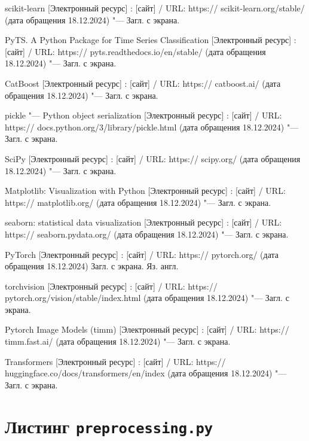 \documentclass[spec, och, diploma]{SCWorks}
\begin{document}
\begin{thebibliography}{99}
     scikit-learn [Электронный ресурс] : [сайт] / URL:
    https:// scikit-learn.org/stable/ (дата обращения 18.12.2024) "--- Загл. с
    экрана.

     PyTS. A Python Package for Time Series Classification
    [Электронный ресурс] : [сайт] / URL: https:// pyts.readthedocs.io/en/stable/
    (дата обращения 18.12.2024) "--- Загл. с экрана.

     CatBoost [Электронный ресурс] : [сайт] / URL:
    https:// catboost.ai/ (дата обращения 18.12.2024) "--- Загл. с экрана.

     pickle "--- Python object serialization [Электронный
    ресурс] : [сайт] / URL: https:// docs.python.org/3/library/pickle.html (дата
    обращения 18.12.2024) "--- Загл. с экрана.

     SciPy [Электронный ресурс] : [сайт] / URL:
    https:// scipy.org/ (дата обращения 18.12.2024) "--- Загл. с экрана.

     Matplotlib: Visualization with Python
    [Электронный
    ресурс] : [сайт] / URL: https:// matplotlib.org/ (дата обращения 18.12.2024)
    "--- Загл. с экрана.

     seaborn: statistical data visualization [Электронный
    ресурс] : [сайт] / URL: https:// seaborn.pydata.org/ (дата обращения
    18.12.2024) "--- Загл. с экрана.

     PyTorch [Электронный ресурс] : [сайт] / URL:
    https:// pytorch.org/ (дата обращения 18.12.2024) Загл. с экрана. Яз. англ.

     torchvision [Электронный ресурс] : [сайт] / URL:
    https:// pytorch.org/vision/stable/index.html (дата обращения 18.12.2024)
    "--- Загл. с экрана.

     Pytorch Image Models (timm) [Электронный ресурс] :
    [сайт] /
    URL: https:// timm.fast.ai/ (дата обращения 18.12.2024) "--- Загл. с экрана.

     Transformers [Электронный ресурс] : [сайт] /
    URL:
    https:// huggingface.co/docs/transformers/en/index (дата обращения
    18.12.2024) "--- Загл. с экрана.

\end{thebibliography}

\appendix

    \section{Листинг \texttt{preprocessing.py}}
    \inputminted{py}{code/preprocessing.py}
\end{document}
